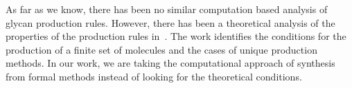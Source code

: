 \documentclass{llncs}
\begin{document}
As far as we know, there has been no similar computation based analysis of glycan production rules.
%
However, there has been a theoretical analysis of the properties of the production
rules in~\cite{Jaiman2018}. The work identifies the conditions for the production
of a finite set of molecules and the cases of unique production methods.
%
In our work, we are taking the computational approach of synthesis from formal methods
instead of looking for the theoretical conditions.

% 
\end{document}
